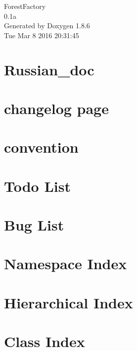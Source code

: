 \documentclass[twoside]{book}
\newcommand{\clearemptydoublepage}{%
  \newpage{\pagestyle{empty}\cleardoublepage}%
}
\begin{document}
\hypersetup{pageanchor=false}
\begin{titlepage}
\vspace*{7cm}
\begin{center}%
{\Large Forest\-Factory \\[1ex]\large 0.\-1a }\\
\vspace*{1cm}
{\large Generated by Doxygen 1.8.6}\\
\vspace*{0.5cm}
{\small Tue Mar 8 2016 20:31:45}\\
\end{center}
\end{titlepage}
\clearemptydoublepage
\tableofcontents
\clearemptydoublepage
{}
\hypersetup{pageanchor=true}

\chapter{Russian\-\_\-doc}
\label{_russian_doc}
\hypertarget{_russian_doc}{}

\chapter{changelog page}
\label{_detailed}
\hypertarget{_detailed}{}

\chapter{convention}
\label{_code}
\hypertarget{_code}{}

\chapter{Todo List}
\label{todo}
\hypertarget{todo}{}

\chapter{Bug List}
\label{bug}
\hypertarget{bug}{}

\chapter{Namespace Index}

\chapter{Hierarchical Index}

\chapter{Class Index}

\end{document}
